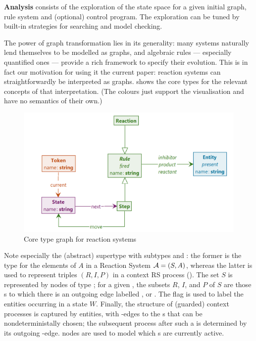 \textbf{Analysis} consists of the exploration of the state space for a given initial graph, rule system and (optional) control program. The exploration can be tuned by built-in strategies for searching and model checking.

\medskip\noindent
The power of graph transformation lies in its generality: many systems naturally lend themselves to be modelled as graphs, and algebraic rules --- especially quantified ones --- provide a rich framework to specify their evolution. This is in fact our motivation for using it the current paper: reaction systems can straightforwardly be interpreted as graphs.  shows the core types for the relevant concepts of that interpretation. (The colours just support the visualisation and have no semantics of their own.)

\begin{figure}
\centering
\includegraphics[scale=.2]{figs/core-type}
\caption{Core type graph for reaction systems}
\label{fig:core-type}
\end{figure}
%
Note especially the (abstract) supertype \Rule with subtypes \Reaction and \Step: the former is the type for the elements of $A$ in a Reaction System ${\cal A}=(S,A)$, whereas the latter is used to represent triples $(R,I,P)$ in a context RS process (). The set $S$ is represented by nodes of type \Entity; for a given \Rule, the subsets $R$, $I$, and $P$ of $S$ are those \Entity{}s to which there is an outgoing edge labelled \reactant, \inhibitor or \product. The flag \present is used to label the entities occurring in a state $W$. Finally, the structure of (guarded) context processes is captured by \State entities, with \nextt-edges to the \Step{}s that can be nondeterministally chosen; the subsequent process after such a \Step is determined by its outgoing \move-edge. \Token nodes are used to model which \State{}s are currently active.

